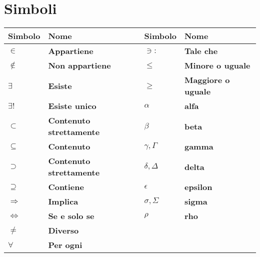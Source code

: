 \section{Simboli}

\setlength{\tabcolsep}{12pt}
\renewcommand*{\arraystretch}{1.2}
\begin{tabular}{ll|ll}
	\hline
	Simbolo & Nome &Simbolo & Nome\\
	\hline
	$\mathcal{\in}$&{\bf Appartiene}&	$\ni :$& {\bf Tale che}\\
	$\notin$&{\bf Non appartiene}&	$\leq$& {\bf Minore o uguale}\\
	$\exists$&{\bf Esiste}&	$\geq$& {\bf Maggiore o uguale}\\
	$\exists !$& {\bf Esiste unico}&	$\alpha$ &{\bf alfa}\\
	$\subset$& {\bf Contenuto strettamente}&	$\beta$& {\bf beta}\\
	$\subseteq$& {\bf Contenuto}&	$\gamma,\Gamma$& {\bf gamma}\\
	$\supset$& {\bf Contenuto strettamente}&	$\delta,\Delta$& {\bf delta}\\
	$\supseteq$& {\bf Contiene}&	 $\epsilon$& {\bf epsilon}\\
	$\Rightarrow$& {\bf Implica}&	$\sigma,\Sigma$& {\bf sigma}\\
	$\Longleftrightarrow$& {\bf Se e solo se}&	$\rho$& {\bf rho}\\
	$\neq$& {\bf Diverso}&	\\
	$\forall$& {\bf Per ogni}&	\\
	\hline
\end{tabular}
